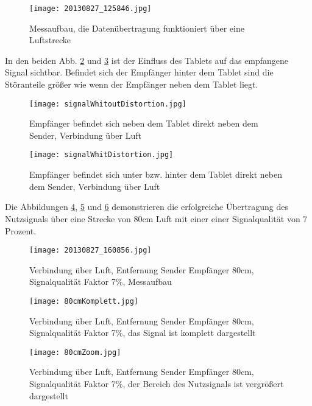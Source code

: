 \documentclass[10pt]{scrartcl}
\begin{document}
\begin{figure}[h!]
	\centering
	\texttt{[image: 20130827\_125846.jpg]}
	\caption{Messaufbau, die Datenübertragung funktioniert über eine Luftstrecke}
	\label{img:Verbindung über Luft}
\end{figure}

\clearpage
\newpage

In den beiden Abb. \ref{img:KeineStörungenVomTablet} und \ref{img:StörungenVomTablet} ist der Einfluss des Tablets auf das empfangene Signal sichtbar. Befindet sich der Empfänger hinter dem Tablet sind die Störanteile größer wie wenn der Empfänger neben dem Tablet liegt.
\begin{figure}[h!]
	\centering
	\texttt{[image: signalWhitoutDistortion.jpg]}
	\caption{Empfänger befindet sich neben dem Tablet direkt neben dem Sender, Verbindung über Luft}
	\label{img:KeineStörungenVomTablet}
\end{figure}

\begin{figure}[h!]
	\centering
	\texttt{[image: signalWhitDistortion.jpg]}
	\caption{Empfänger befindet sich unter bzw. hinter dem Tablet direkt neben dem Sender, Verbindung über Luft}
	\label{img:StörungenVomTablet}
\end{figure}

\clearpage
\newpage

Die Abbildungen \ref{img:Messaufbau}, \ref{img:KomplettSignal} und \ref{img:NutzsignalVergroessert} demonstrieren die erfolgreiche Übertragung des Nutzsignals über eine Strecke von 80cm Luft mit einer einer Signalqualität von 7 Prozent.

\begin{figure}[h!]
	\centering
	\texttt{[image: 20130827\_160856.jpg]}
	\caption{Verbindung über Luft, Entfernung Sender Empfänger 80cm, Signalqualität Faktor 7\%, Messaufbau}
	\label{img:Messaufbau}
\end{figure}

\begin{figure}[h!]
	\centering
	\texttt{[image: 80cmKomplett.jpg]}
	\caption{Verbindung über Luft, Entfernung Sender Empfänger 80cm, Signalqualität Faktor 7\%, das Signal ist komplett dargestellt}
	\label{img:KomplettSignal}
\end{figure}

\begin{figure}[h!]
	\centering
	\texttt{[image: 80cmZoom.jpg]}
	\caption{Verbindung über Luft, Entfernung Sender Empfänger 80cm, Signalqualität Faktor 7\%, der Bereich des Nutzsignals ist vergrößert dargestellt}
	\label{img:NutzsignalVergroessert}
\end{figure}
\end{document}
